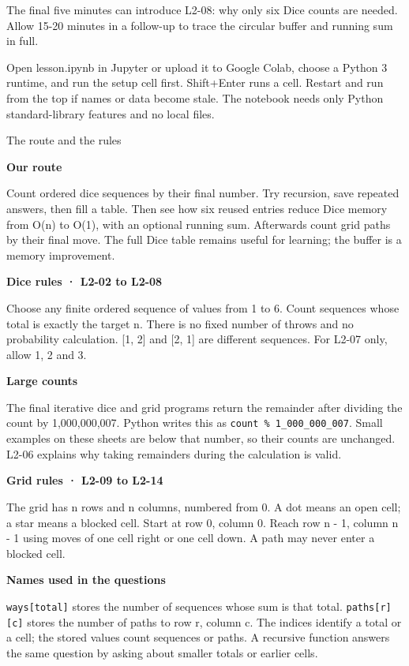 \documentclass[11pt,a4paper]{article}
\newcommand{\topic}[2]{\clearpage\markboth{#2}{}{\color{quiet}\fontsize{9}{12}\selectfont\textbf{#1}}\par{\heavy\fontsize{19}{23}\selectfont\raggedright #2\par}\vspace{5pt}}
\begin{document}
The final five minutes can introduce L2-08: why only six Dice counts are needed. Allow 15-20 minutes in a follow-up to trace the circular buffer and running sum in full.

Open lesson.ipynb in Jupyter or upload it to Google Colab, choose a Python 3 runtime, and run the setup cell first. Shift+Enter runs a cell. Restart and run from the top if names or data become stale. The notebook needs only Python standard-library features and no local files.
\topic{KEEP BESIDE YOUR WORK}{The route and the rules}
\textbf{Our route}\par Count ordered dice sequences by their final number. Try recursion, save repeated answers, then fill a table. Then see how six reused entries reduce Dice memory from O(n) to O(1), with an optional running sum. Afterwards count grid paths by their final move. The full Dice table remains useful for learning; the buffer is a memory improvement.\par\medskip
\textbf{Dice rules · L2-02 to L2-08}\par Choose any finite ordered sequence of values from 1 to 6. Count sequences whose total is exactly the target n. There is no fixed number of throws and no probability calculation. [1, 2] and [2, 1] are different sequences. For L2-07 only, allow 1, 2 and 3.\par\medskip
\textbf{Large counts}\par The final iterative dice and grid programs return the remainder after dividing the count by 1,000,000,007. Python writes this as \texttt{count \% 1\_000\_000\_007}. Small examples on these sheets are below that number, so their counts are unchanged. L2-06 explains why taking remainders during the calculation is valid.\par\medskip
\textbf{Grid rules · L2-09 to L2-14}\par The grid has n rows and n columns, numbered from 0. A dot means an open cell; a star means a blocked cell. Start at row 0, column 0. Reach row n - 1, column n - 1 using moves of one cell right or one cell down. A path may never enter a blocked cell.\par\medskip
\textbf{Names used in the questions}\par \texttt{ways[total]} stores the number of sequences whose sum is that total. \texttt{paths[r][c]} stores the number of paths to row r, column c. The indices identify a total or a cell; the stored values count sequences or paths. A recursive function answers the same question by asking about smaller totals or earlier cells.\par\medskip
\end{document}

